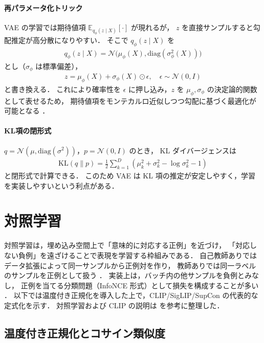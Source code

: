 \paragraph{再パラメータ化トリック}
VAE の学習では期待値項 $\mathbb{E}_{q_\phi(z\mid X)}[\cdot]$ が現れるが，
$z$ を直接サンプルすると勾配推定が高分散になりやすい．
そこで $q_\phi(z\mid X)$ を
\begin{align}
  q_\phi(z\mid X)=\mathcal{N}\!\bigl(\mu_\phi(X),\mathrm{diag}(\sigma_\phi^2(X))\bigr)
\end{align}
とし（$\sigma_\phi$ は標準偏差），
\begin{align}
  z=\mu_\phi(X)+\sigma_\phi(X)\odot\epsilon,\quad \epsilon\sim\mathcal{N}(0,I)
\end{align}
と書き換える．
これにより確率性を $\epsilon$ に押し込み，$z$ を $\mu_\phi,\sigma_\phi$ の決定論的関数として表せるため，
期待値項をモンテカルロ近似しつつ勾配に基づく最適化が可能となる \cite{VAE}．

\paragraph{KL項の閉形式}
$q=\mathcal{N}(\mu,\mathrm{diag}(\sigma^2))$，$p=\mathcal{N}(0,I)$ のとき，
KL ダイバージェンスは
\begin{align}
  \mathrm{KL}(q\|p)
  = \frac{1}{2}\sum_{k=1}^{D}\left(\mu_k^2+\sigma_k^2-\log\sigma_k^2-1\right)
  \label{eq:kl_gaussian}
\end{align}
と閉形式で計算できる．
このため VAE は KL 項の推定が安定しやすく，学習を実装しやすいという利点がある．




\section{対照学習}
\label{sec:contrastive}

対照学習は，埋め込み空間上で「意味的に対応する正例」を近づけ，
「対応しない負例」を遠ざけることで表現を学習する枠組みである．
自己教師ありではデータ拡張によって同一サンプルから正例対を作り，
教師ありでは同一ラベルのサンプルを正例として扱う \cite{supcon}．
実装上は，バッチ内の他サンプルを負例とみなし，
正例を当てる分類問題（InfoNCE 形式）として損失を構成することが多い \cite{clip}．
以下では温度付き正規化を導入した上で，CLIP/SigLIP/SupCon の代表的な定式化を示す．
対照学習および CLIP の説明は\cite{kikuta2025genai} を参考に整理した．

\subsection{温度付き正規化とコサイン類似度}
\label{subsec:cosine_temp}

